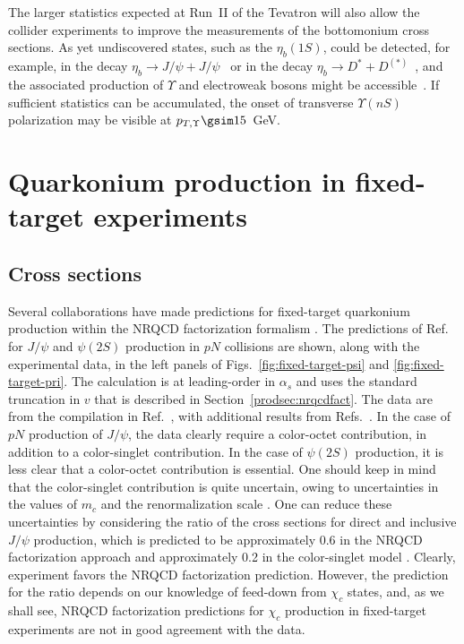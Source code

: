 The larger statistics expected at Run~II of the Tevatron will also allow
the collider experiments to improve the measurements of the bottomonium
cross sections. As yet undiscovered states, such as the $\eta_b(1S)$,
could be detected, for example, in the decay $\eta_b \to J/\psi +
J/\psi$~\cite{Braaten:2000cm} or in the decay $\eta_b \to D^* +
D^{(*)}$~\cite{Maltoni:2004hv}, and the associated production of
$\Upsilon$ and electroweak bosons might be
accessible~\cite{Braaten:1999th}. If sufficient statistics can be
accumulated, the onset of transverse $\Upsilon(nS)$ polarization may be
visible at $p_{T,\Upsilon}\gsim 15$~GeV.
 

\section{Quarkonium production in fixed-target experiments}
\label{prodsec:fixed-target}

\subsection{Cross sections}
\label{prodsec:fixed-targetxsec}

Several collaborations have made predictions for fixed-target quarkonium
production within the NRQCD factorization formalism
\cite{Beneke:1996tk,Tang:1996rm,Gupta:1996ut}. The predictions of
Ref.~\cite{Beneke:1996tk} for $J/\psi$ and $\psi(2S)$ production in $pN$
collisions are shown, along with the experimental data, 
in the left panels of 
Figs.~\ref{fig:fixed-target-psi} and \ref{fig:fixed-target-pri}. The
calculation is at leading-order in $\alpha_s$ and uses the standard
truncation in $v$ that is described in Section~\ref{prodsec:nrqcdfact}.
The data are from the compilation in Ref.~\cite{Schuler:1994hy}, with
additional results from
Refs.~\cite{Tzamarias:1990ij,Schub:1995pu,Alexopoulos:1995dt}. In the
case of $pN$ production of $J/\psi$, the data clearly require a
color-octet contribution, in addition to a color-singlet contribution.
In the case of $\psi(2S)$ production, it is less clear that a
color-octet contribution is essential. One should keep in mind that the
color-singlet contribution is quite uncertain, owing to uncertainties in
the values of $m_c$ and the renormalization scale \cite{Beneke:1997av}.
One can reduce these uncertainties by considering the ratio of the cross
sections for direct and inclusive $J/\psi$ production, which is
predicted to be approximately 0.6 in the NRQCD factorization approach and
approximately 0.2 in the color-singlet model \cite{Beneke:1997av}.
Clearly, experiment favors the NRQCD factorization prediction. However,
the prediction for the ratio depends on our knowledge of feed-down from
$\chi_c$ states, and, as we shall see, NRQCD factorization predictions
for $\chi_c$ production in fixed-target experiments
are not in good agreement with the data.

